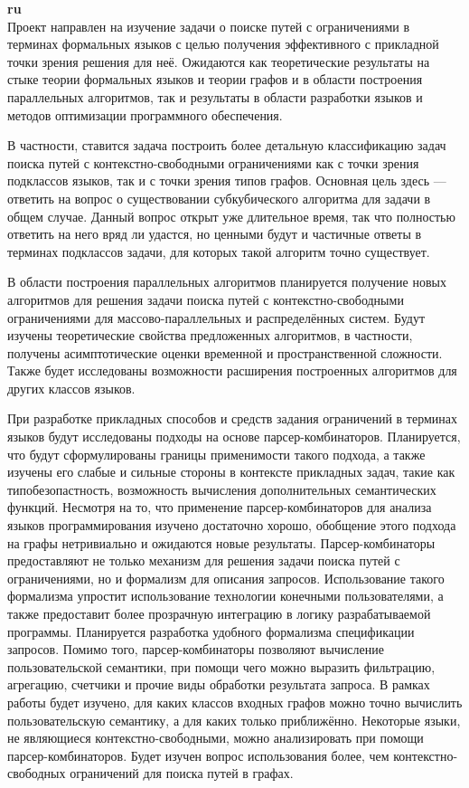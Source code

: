 \documentclass[12pt]{article}  %
\theoremstyle{remark}
\begin{document}
\textbf{ru}\\
%
Проект направлен на изучение задачи о поиске путей с ограничениями в терминах формальных языков с целью получения эффективного с прикладной точки зрения решения для неё.
Ожидаются как теоретические результаты на стыке теории формальных языков и теории графов и в области построения параллельных алгоритмов, так и результаты в области разработки языков и методов оптимизации программного обеспечения.

В частности, ставится задача построить более детальную классификацию задач поиска путей с контекстно-свободными ограничениями как с точки зрения подклассов языков, так и с точки зрения типов графов.
Основная цель здесь --- ответить на вопрос о существовании субкубического алгоритма для задачи в общем случае.
Данный вопрос открыт уже длительное время, так что полностью ответить на него вряд ли удастся, но ценными будут и частичные ответы в терминах подклассов задачи, для которых такой алгоритм точно существует.

В области построения параллельных алгоритмов планируется получение новых алгоритмов для решения задачи поиска путей с контекстно-свободными ограничениями для массово-параллельных и распределённых систем.
Будут изучены теоретические свойства предложенных алгоритмов, в частности, получены асимптотические оценки временной и пространственной сложности.
Также будет исследованы возможности расширения построенных алгоритмов для других классов языков.

При разработке прикладных способов и средств задания ограничений в терминах языков будут исследованы подходы на основе парсер-комбинаторов.
Планируется, что будут сформулированы границы применимости такого подхода, а также изучены его слабые и сильные стороны в контексте прикладных задач, такие как типобезопастность, возможность вычисления дополнительных семантических функций.
Несмотря на то, что применение парсер-комбинаторов для анализа языков программирования изучено достаточно хорошо, обобщение этого подхода на графы нетривиально и ожидаются новые результаты.
Парсер-комбинаторы предоставляют не только механизм для решения задачи поиска путей с ограничениями, но и формализм для описания запросов.
Использование такого формализма упростит использование технологии конечными пользователями, а также предоставит более прозрачную интеграцию в логику разрабатываемой программы.
Планируется разработка удобного формализма спецификации запросов.
Помимо того, парсер-комбинаторы позволяют вычисление пользовательской семантики, при помощи чего можно выразить фильтрацию, агрегацию, счетчики и прочие виды обработки результата запроса.
В рамках работы будет изучено, для каких классов входных графов можно точно вычислить пользовательскую семантику, а для каких только приближённо.
Некоторые языки, не являющиеся контекстно-свободными, можно анализировать при помощи парсер-комбинаторов.
Будет изучен вопрос использования более, чем контекстно-свободных ограничений для поиска путей в графах.
\end{document}

